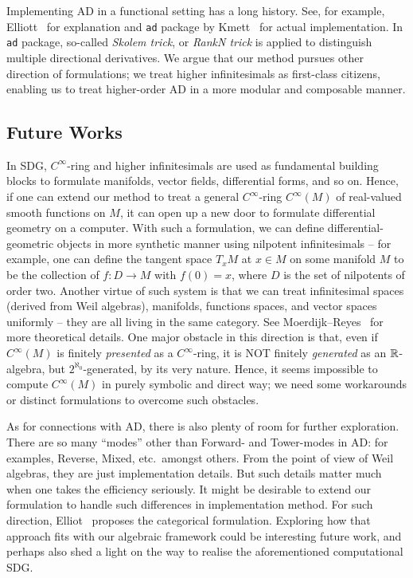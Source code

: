 Implementing AD in a functional setting has a long history.
See, for example, Elliott~\cite{Elliott2009-beautiful-differentiation} for explanation and \texttt{ad} package by Kmett~\cite{Kmett:2010aa} for actual implementation.
In \texttt{ad} package, so-called \emph{Skolem trick}, or \emph{RankN trick} is applied to distinguish multiple directional derivatives.
We argue that our method pursues other direction of formulations; we treat higher infinitesimals as first-class citizens, enabling us to treat higher-order AD in a more modular and composable manner.

\subsection{Future Works}
In SDG, $C^\infty$-ring and higher infinitesimals are used as fundamental building blocks to formulate manifolds, vector fields, differential forms, and so on.
Hence, if one can extend our method to treat a general $C^\infty$-ring $C^\infty(M)$ of real-valued smooth functions on $M$, it can open up a new door to formulate differential geometry on a computer.
With such a formulation, we can define differential-geometric objects in more synthetic manner using nilpotent infinitesimals -- for example, one can define the tangent space $T_x M$ at $x \in M$ on some manifold $M$ to be the collection of $f: D \to M$ with $f(0) = x$, where $D$ is the set of nilpotents of order two.
Another virtue of such system is that we can treat infinitesimal spaces (derived from Weil algebras), manifolds, functions spaces, and vector spaces uniformly -- they are all living in the same category.
See Moerdijk--Reyes~\cite{Moerdijk:1991aa} for more theoretical details.
One major obstacle in this direction is that, even if $C^\infty(M)$ is finitely \emph{presented} as a $C^\infty$-ring, it is NOT finitely \emph{generated} as an $\mathbb{R}$-algebra, but $2^{\aleph_0}$-generated, by its very nature.
Hence, it seems impossible to compute $C^\infty(M)$ in purely symbolic and direct way; we need some workarounds or distinct formulations to overcome such obstacles.

As for connections with AD, there is also plenty of room for further exploration.
There are so many ``modes'' other than Forward- and Tower-modes in AD: for examples, Reverse, Mixed, etc.\ amongst others.
From the point of view of Weil algebras, they are just implementation details.
But such details matter much when one takes the efficiency seriously.
It might be desirable to extend our formulation to handle such differences in implementation method.
For such direction, Elliot~\cite{Elliott:2018aa} proposes the categorical formulation.
Exploring how that approach fits with our algebraic framework could be interesting future work, and perhaps also shed a light on the way to realise the aforementioned computational SDG.

